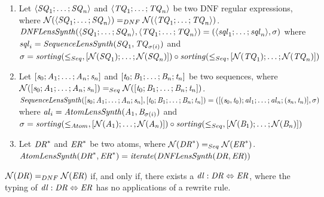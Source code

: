 \begin{definition}
  \begin{enumerate}
  \item
    Let
    $\langle\mathit{SQ}_1;\ldots;\mathit{SQ}_n\rangle$
    and
    $\langle\mathit{TQ}_1;\ldots;\mathit{TQ}_n\rangle$
    be two DNF regular expressions, where
    $\mathcal{N}(\langle\mathit{SQ}_1;\ldots;\mathit{SQ}_n\rangle) =_{DNF}
    \mathcal{N}(\langle\mathit{TQ}_1;\ldots;\mathit{TQ}_n\rangle)$.
    $\mathit{DNFLensSynth}(\langle\mathit{SQ}_1;\ldots;\mathit{SQ}_n\rangle,\langle\mathit{TQ}_1;\ldots;\mathit{TQ}_n\rangle)=
    (\langle\mathit{sql}_1;\ldots;\mathit{sql}_n\rangle,\sigma)$
    where
    $\mathit{sql}_i=\mathit{SequenceLensSynth}(\mathit{SQ}_1,\mathit{TQ}_{\sigma(i)})$
    and
    $\sigma=\mathit{sorting}(\leq_{Seq},[ \mathcal{N}(\mathit{SQ}_1);\ldots;\mathcal{N}(\mathit{SQ}_n) ])
    \circ
    \mathit{sorting}(\leq_{Seq},[ \mathcal{N}(\mathit{TQ}_1);\ldots;\mathcal{N}(\mathit{TQ}_n) ])$
  \item
    Let
    $[\mathit{s}_0;\mathit{A}_1;\ldots;\mathit{A}_n;\mathit{s}_n]$
    and
    $[\mathit{t}_0;\mathit{B}_1;\ldots;\mathit{B}_n;\mathit{t}_n]$
    be two sequences, where
    $\mathcal{N}([\mathit{s}_0;\mathit{A}_1;\ldots;\mathit{A}_n;\mathit{s}_n]) =_{Seq}
    \mathcal{N}([\mathit{t}_0;\mathit{B}_1;\ldots;\mathit{B}_n;\mathit{t}_n])$.
    $\mathit{SequenceLensSynth}([\mathit{s}_0;\mathit{A}_1;\ldots;\mathit{A}_n;\mathit{s}_n],[\mathit{t}_0;\mathit{B}_1;\ldots;\mathit{B}_n;\mathit{t}_n])=
    ([(\mathit{s}_0,\mathit{t}_0);\mathit{al}_1;\ldots;\mathit{al}_n;(\mathit{s}_n,\mathit{t}_n)],\sigma)$
    where
    $\mathit{al}_i=\mathit{AtomLensSynth}(\mathit{A}_1,\mathit{B}_{\sigma(i)})$
    and
    $\sigma=\mathit{sorting}(\leq_{Atom},[ \mathcal{N}(\mathit{A}_1);\ldots;\mathcal{N}(\mathit{A}_n) ])
    \circ
    \mathit{sorting}(\leq_{Seq},[ \mathcal{N}(\mathit{B}_1);\ldots;\mathcal{N}(\mathit{B}_n) ])$
  \item
    Let
    ${\mathit{DR}}^*$
    and
    ${\mathit{ER}}^*$
    be two atoms, where
    $\mathcal{N}({\mathit{DR}}^*) =_{Seq}
    \mathcal{N}({\mathit{ER}}^*)$.
    $\mathit{AtomLensSynth}({\mathit{DR}}^*,{\mathit{ER}}^*)=
    \mathit{iterate(\mathit{DNFLensSynth}(\mathit{DR},\mathit{ER}))}$
  \end{enumerate}
\end{definition}

\begin{theorem}
  $\mathcal{N}(\mathit{DR})=_{DNF}\mathcal{N}(\mathit{ER})$
  if, and only
  if, there exists a $\mathit{dl} : \mathit{DR} \Leftrightarrow \mathit{ER}$,
  where the typing of $\mathit{dl}:\mathit{DR}\Leftrightarrow\mathit{ER}$
  has no applications of a rewrite rule.
\end{theorem}

